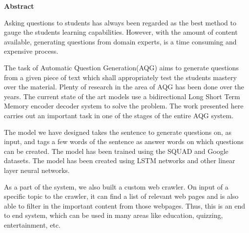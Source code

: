 \newpage
\begin{center}
\Large \textbf{Abstract}
\end{center}
Asking questions to students has always been regarded as the best method to gauge the students learning capabilities. However, with the amount of content available, generating questions from domain experts, is a time consuming and expensive process. 

The task of Automatic Question Generation(AQG) aims to generate questions from a given piece of text which shall appropriately test the students mastery over the material. Plenty of research in the area of AQG has been done over the years. The current state of the art models use a bidirectional Long Short Term Memory encoder decoder system to solve the problem. The work presented here carries out an important task in one of the stages of the entire AQG system. 

The model we have designed takes the sentence to generate questions on, as input, and tags a few words of the sentence as answer words on which questions can be created. The model has been trained using the SQUAD and Google datasets. The model has been created using LSTM networks and other linear layer neural networks. 

As a part of the system, we also built a custom web crawler. On input of a specific topic to the crawler, it can find a list of relevant web pages and is also able to filter in the important content from those webpages. Thus, this is an end to end system, which can be used in many areas like education, quizzing, entertainment, etc. 

